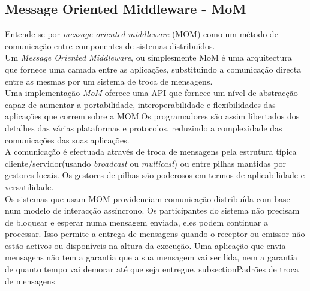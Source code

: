 \subsection{Message Oriented Middleware - MoM}

\label{sec:mom}
Entende-se por \textit{message oriented middleware} (MOM) como um método de comunicação entre componentes de sistemas distribuídos.\\

Um \textit{Message Oriented Middleware}, ou simplesmente MoM é uma arquitectura que fornece uma camada entre as aplicaçães, substituindo a comunicação directa entre as mesmas por um sistema de troca de mensagens.\\
Uma implementação \textit{MoM} oferece uma API que fornece um nível de abstracção capaz de aumentar a portabilidade, interoperabilidade e flexibilidades das aplicações que correm sobre a MOM.Os programadores são assim libertados dos detalhes das várias plataformas e protocolos, reduzindo a complexidade das comunicações das suas aplicações.\\
A comunicação é efectuada através de troca de mensagens pela estrutura típica cliente/servidor(usando \textit{broadcast} ou \textit{multicast}) ou entre pilhas mantidas por gestores locais. Os gestores de pilhas são poderosos em termos de aplicabilidade e versatilidade.\\ 
Os sistemas que usam MOM providenciam comunicação distribuída com base num modelo de interacção assíncrono. Os participantes do sistema não precisam de bloquear e esperar numa mensagem enviada, eles podem continuar a processar. Isso permite a entrega de mensagens quando o receptor ou emissor não estão activos ou disponíveis na altura da execução. Uma aplicação que envia mensagens não tem a garantia que a sua mensagem vai ser lida, nem  a garantia de quanto tempo vai demorar até que seja entregue. 
subsection{Padrões de troca de mensagens }
